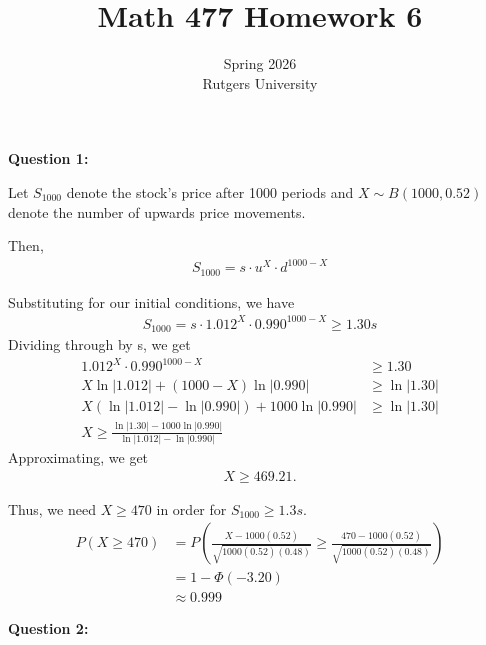 \documentclass[12pt]{article}
\title{Math 477 Homework 6}
\author{Spring 2026 \\ Rutgers University}
\begin{document}
\maketitle

\noindent{}\textbf{Question 1:}

Let $S_{1000}$ denote the stock's price after 1000 periods and $X \sim B(1000, 0.52)$ denote the number of upwards price movements.

Then,
\begin{align*}
    S_{1000} = s \cdot u^X \cdot d^{1000-X}
\end{align*}

Substituting for our initial conditions, we have
\begin{align*}
    S_{1000} = s \cdot 1.012^X \cdot 0.990^{1000-X} \geq 1.30s
\end{align*}
Dividing through by s, we get
\begin{align*}
    1.012^X \cdot 0.990^{1000-X}                  & \geq 1.30      \\
    X \ln|1.012| + (1000 - X) \ln|0.990|          & \geq \ln|1.30| \\
    X (\ln|1.012| - \ln|0.990|) +  1000\ln|0.990| & \geq \ln|1.30| \\
    X \geq \frac{\ln|1.30| - 1000\ln|0.990|}{\ln|1.012| - \ln|0.990|}
\end{align*}
Approximating, we get
\begin{align*}
    X \geq 469.21.
\end{align*}

Thus, we need $X \geq 470$ in order for $S_{1000} \geq 1.3s$.
\begin{align*}
    P(X \geq 470) & = P(\frac{X - 1000(0.52)}{\sqrt{1000(0.52)(0.48)}} \geq \frac{470-1000(0.52)}{\sqrt{1000(0.52)(0.48)}}) \\
                  & = 1 - \Phi(-3.20)                                                                                       \\
                  & \approx {0.999}
\end{align*}

\noindent{}\textbf{Question 2:}
\end{document}
